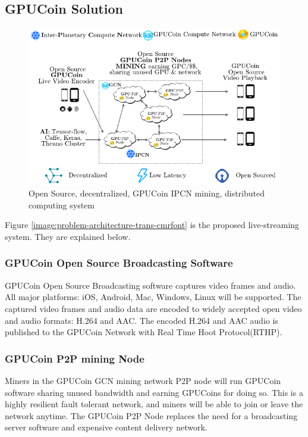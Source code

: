 \documentclass{article}
\begin{document}
\subsection{GPUCoin Solution}

\begin{figure}[h!]
 \centering
 \includegraphics[width=1.0\textwidth]{static/gpctokens-solution-trans-ai-cmrfont}
 \caption{Open Source, decentralized, GPUCoin IPCN mining, distributed computing system}
 \label{image:gpctokens-solution-trans-ai-cmrfont}
\end{figure}


Figure \ref{image:problem-architecture-trans-cmrfont} is the proposed live-streaming system. They are explained below.
\subsubsection{GPUCoin Open Source Broadcasting Software}
GPUCoin Open Source Broadcasting software captures video frames and audio. All major platforms: iOS, Android, Mac, Windows, Linux will be supported. The captured video frames and audio data are encoded to widely accepted open video and audio formats: H.264 and AAC. The encoded H.264 and AAC audio is published to the GPUCoin Network with Real Time Hoot Protocol(RTHP).

\subsubsection{GPUCoin P2P mining Node}
Miners in the GPUCoin GCN mining network P2P node will run GPUCoin software sharing unused bandwidth and earning GPUCoins for doing so. This is a highly resilient fault tolerant network, and miners will be able to join or leave the network anytime. The GPUCoin P2P Node replaces the need for a broadcasting server software and expensive content delivery network.
\end{document}
